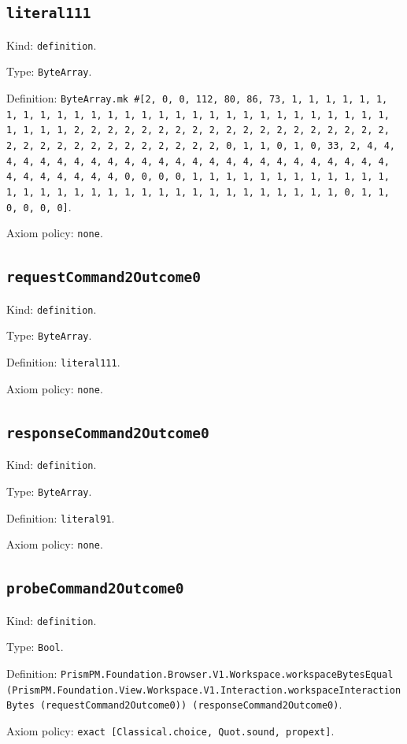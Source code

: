 \documentclass[11pt]{article}
\begin{document}
\subsection*{\texttt{literal111}}
\noindent Kind: \texttt{definition}.\par
\noindent Type: \texttt{ByteArray}.\par
\noindent Definition: \texttt{ByteArray.mk \#[2, 0, 0, 112, 80, 86, 73, 1, 1, 1, 1, 1, 1, 1, 1, 1, 1, 1, 1, 1, 1, 1, 1, 1, 1, 1, 1, 1, 1, 1, 1, 1, 1, 1, 1, 1, 1, 1, 1, 1, 2, 2, 2, 2, 2, 2, 2, 2, 2, 2, 2, 2, 2, 2, 2, 2, 2, 2, 2, 2, 2, 2, 2, 2, 2, 2, 2, 2, 2, 2, 2, 2, 0, 1, 1, 0, 1, 0, 33, 2, 4, 4, 4, 4, 4, 4, 4, 4, 4, 4, 4, 4, 4, 4, 4, 4, 4, 4, 4, 4, 4, 4, 4, 4, 4, 4, 4, 4, 4, 4, 4, 4, 0, 0, 0, 0, 1, 1, 1, 1, 1, 1, 1, 1, 1, 1, 1, 1, 1, 1, 1, 1, 1, 1, 1, 1, 1, 1, 1, 1, 1, 1, 1, 1, 1, 1, 1, 1, 0, 1, 1, 0, 0, 0, 0]}.\par
\noindent Axiom policy: \texttt{none}.\par
\subsection*{\texttt{requestCommand2Outcome0}}
\noindent Kind: \texttt{definition}.\par
\noindent Type: \texttt{ByteArray}.\par
\noindent Definition: \texttt{literal111}.\par
\noindent Axiom policy: \texttt{none}.\par
\subsection*{\texttt{responseCommand2Outcome0}}
\noindent Kind: \texttt{definition}.\par
\noindent Type: \texttt{ByteArray}.\par
\noindent Definition: \texttt{literal91}.\par
\noindent Axiom policy: \texttt{none}.\par
\subsection*{\texttt{probeCommand2Outcome0}}
\noindent Kind: \texttt{definition}.\par
\noindent Type: \texttt{Bool}.\par
\noindent Definition: \texttt{PrismPM.Foundation.Browser.V1.Workspace.workspaceBytesEqual (PrismPM.Foundation.View.Workspace.V1.Interaction.workspaceInteractionBytes (requestCommand2Outcome0)) (responseCommand2Outcome0)}.\par
\noindent Axiom policy: \texttt{exact [Classical.choice, Quot.sound, propext]}.\par
\end{document}
